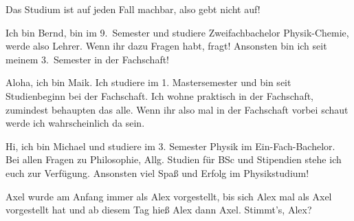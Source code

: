 \begin{multicols*}{2}
{Das Studium ist auf jeden Fall machbar, also gebt nicht auf!}

{Ich bin Bernd, bin im 9.\ Semester und studiere Zweifachbachelor Physik-Chemie, werde also Lehrer. Wenn ihr dazu Fragen habt, fragt! Ansonsten bin ich seit meinem 3.\ Semester in der Fachschaft!
\vspace{2\baselineskip}}

{Aloha, ich bin Maik. Ich studiere im 1. Mastersemester und bin seit Studienbeginn bei der Fachschaft. Ich wohne praktisch in der Fachschaft, zumindest behaupten das alle. Wenn ihr also mal in der Fachschaft vorbei schaut werde ich wahrscheinlich da sein.}


{Hi, ich bin Michael und studiere im 3. Semester Physik im Ein-Fach-Bachelor. Bei allen Fragen zu Philosophie, Allg. Studien für BSc und Stipendien stehe ich euch zur Verfügung. Ansonsten viel Spaß und Erfolg im Physikstudium!}


{Axel wurde am Anfang immer als Alex vorgestellt, bis sich Alex mal als Axel vorgestellt hat und ab diesem Tag hieß Alex dann Axel. Stimmt's, Alex?
\vspace{2\baselineskip}}


\end{multicols*}
